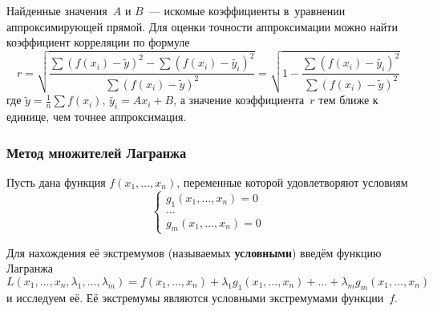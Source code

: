 Найденные значения~$A$ и $B$~--- искомые коэффициенты в~уравнении аппроксимирующей прямой.
Для оценки точности аппроксимации можно найти коэффициент корреляции по формуле
\begin{equation*}
r = \sqrt{\frac
{\sum (f(x_i) - \tilde y)^2 - \sum (f(x_i) - \tilde{y_i})^2}
{\sum (f(x_i) - \tilde y)^2}} =
\sqrt{1 - \frac{\sum (f(x_i) - \tilde{y_i})^2}{\sum (f(x_i) - \tilde y)^2}}
\end{equation*}
где $\tilde y = \frac1n \sum f(x_i)$, $\tilde{y_i} = A x_i + B$, а значение коэффициента~$r$ тем ближе к единице, чем точнее аппроксимация.
	
\subsubsection{Метод множителей Лагранжа}
Пусть дана функция $f(x_1, \ldots, x_n)$, переменные которой удовлетворяют условиям
\begin{equation*}
\begin{cases}
g_1(x_1, \ldots, x_n) = 0 \\
\ldots \\
g_m(x_1, \ldots, x_n) = 0
\end{cases}
\end{equation*}

Для нахождения её экстремумов (называемых \textbf{условными}) введём функцию Лагранжа
\begin{equation*}
L(x_1, \ldots, x_n, \lambda_1, \ldots, \lambda_m) =
f(x_1, \ldots, x_n) + \lambda_1 g_1(x_1, \ldots, x_n) + \ldots + \lambda_m g_m(x_1, \ldots, x_n)
\end{equation*}
и исследуем её.
Её экстремумы являются условными экстремумами функции~$f$.